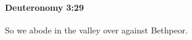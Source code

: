 
		\paragraph{Deuteronomy 3:29} %
			\label{DEUTERONOMY-3-29}

			So we abode in the valley over against Bethpeor.

